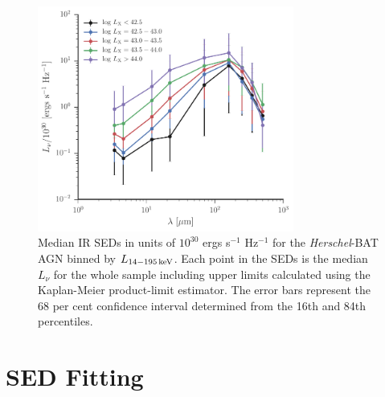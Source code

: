 \documentclass[fleqn, usenatbib]{mnras}
\newcommand{\herschel}{\emph{Herschel}}
\begin{document}
\begin{figure}
\centering
\includegraphics[width=0.75\textwidth]{figures/avg_sed_binned_lx_lnu}
\caption{Median IR SEDs in units of $10^{30}$ ergs s$^{-1}$ Hz$^{-1}$ for the \herschel-BAT AGN binned by $L_{\rm 14-195\,keV}$. Each point in the SEDs is the median $L_{\nu}$ for the whole sample including upper limits calculated using the Kaplan-Meier product-limit estimator. The error bars represent the 68 per cent confidence interval determined from the 16th and 84th percentiles. \label{fig:avg_sed}}
\end{figure}

\section{SED Fitting}\label{sec:sed_fit}
\end{document}
